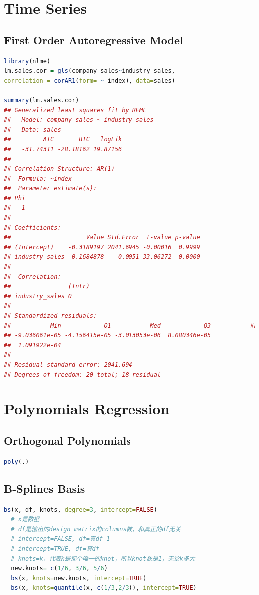 \documentclass[11pt,a4paper]{article}
\begin{document}
\section{Time Series}
\subsection{First Order Autoregressive Model}
\begin{lstlisting}[language=R]
library(nlme)
lm.sales.cor = gls(company_sales~industry_sales,
correlation = corAR1(form= ~ index), data=sales)

summary(lm.sales.cor)
## Generalized least squares fit by REML
##   Model: company_sales ~ industry_sales 
##   Data: sales 
##         AIC       BIC   logLik
##   -31.74311 -28.18162 19.87156
## 
## Correlation Structure: AR(1)
##  Formula: ~index 
##  Parameter estimate(s):
## Phi 
##   1 
## 
## Coefficients:
##                     Value Std.Error  t-value p-value
## (Intercept)    -0.3189197 2041.6945 -0.00016  0.9999
## industry_sales  0.1684878    0.0051 33.06272  0.0000
## 
##  Correlation: 
##                (Intr)
## industry_sales 0     
## 
## Standardized residuals:
##           Min            Q1           Med            Q3           ##           Max
## -9.036061e-05 -4.156415e-05 -3.013053e-06  8.080346e-05  
##  1.091922e-04
## 
## Residual standard error: 2041.694 
## Degrees of freedom: 20 total; 18 residual
\end{lstlisting}





\section{Polynomials Regression}
\subsection{Orthogonal Polynomials}
\begin{lstlisting}[language=R]
  poly(.)
\end{lstlisting}
\subsection{B-Splines Basis}
\begin{lstlisting}[language=R]
  bs(x, df, knots, degree=3, intercept=FALSE)
  # x是数据
  # df是输出的design matrix的columns数，和真正的df无关
  # intercept=FALSE, df=真df-1
  # intercept=TRUE, df=真df
  # knots=k，代表k是那个唯一的knot，所以knot数是1，无论k多大
  new.knots= c(1/6, 3/6, 5/6)
  bs(x, knots=new.knots, intercept=TRUE)
  bs(x, knots=quantile(x, c(1/3,2/3)), intercept=TRUE)
\end{lstlisting}
\end{document}

